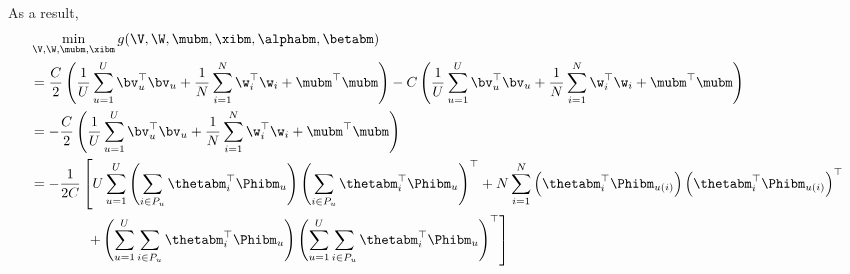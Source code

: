 As a result,
\begin{equation}
\label{eq:gmin}
\begin{aligned}
&\min_{\V, \W, \mubm, \xibm} g(\V, \W, \mubm, \xibm, \alphabm, \betabm) \\
&= \frac{C}{2} \left( \frac{1}{U} \sum_{u=1}^U \bv_u^\top \bv_u 
     + \frac{1}{N} \sum_{i=1}^N \w_i^\top \w_i + \mubm^\top \mubm \right)
     -C \left( \frac{1}{U} \sum_{u=1}^U \bv_u^\top \bv_u + \frac{1}{N} \sum_{i=1}^N \w_i^\top \w_i + \mubm^\top \mubm \right) \\
&= -\frac{C}{2} \left( \frac{1}{U} \sum_{u=1}^U \bv_u^\top \bv_u + \frac{1}{N} \sum_{i=1}^N \w_i^\top \w_i + \mubm^\top \mubm \right) \\
&= -\frac{1}{2 C} \left[
     U \sum_{u=1}^U \left( \sum_{i \in P_u} \thetabm_i^\top \Phibm_u \right) \left( \sum_{i \in P_u} \thetabm_i^\top \Phibm_u \right)^\top
   + N \sum_{i=1}^N \left( \thetabm_i^\top \Phibm_{u(i)} \right) \left( \thetabm_i^\top \Phibm_{u(i)} \right)^\top \right. \\
& \hspace{4em} \left.
   + \left( \sum_{u=1}^U \sum_{i \in P_u} \thetabm_i^\top \Phibm_u \right)
     \left( \sum_{u=1}^U \sum_{i \in P_u} \thetabm_i^\top \Phibm_u \right)^\top \right]
\end{aligned}
\end{equation}

